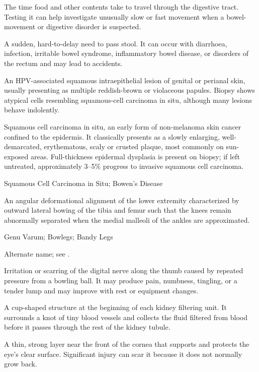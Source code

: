  The time food and other contents take to travel through the digestive tract. Testing it can help investigate unusually slow or fast movement when a bowel-movement or digestive disorder is suspected.

 A sudden, hard-to-delay need to pass stool. It can occur with diarrhoea, infection, irritable bowel syndrome, inflammatory bowel disease, or disorders of the rectum and may lead to accidents.

 An HPV-associated squamous intraepithelial lesion of genital or perianal skin, usually presenting as multiple reddish-brown or violaceous papules. Biopsy shows atypical cells resembling squamous-cell carcinoma in situ, although many lesions behave indolently.

 Squamous cell carcinoma in situ, an early form of non-melanoma skin cancer confined to the epidermis. It classically presents as a slowly enlarging, well-demarcated, erythematous, scaly or crusted plaque, most commonly on sun-exposed areas. Full-thickness epidermal dysplasia is present on biopsy; if left untreated, approximately 3--5\% progress to invasive squamous cell carcinoma.

\synonyms
Squamous Cell Carcinoma in Situ; Bowen’s Disease

 An angular deformational alignment of the lower extremity characterized by outward lateral bowing of the tibia and femur such that the knees remain abnormally separated when the medial malleoli of the ankles are approximated.

\synonyms
Genu Varum; Bowlegs; Bandy Legs

 Alternate name; see .

 Irritation or scarring of the digital nerve along the thumb caused by repeated pressure from a bowling ball. It may produce pain, numbness, tingling, or a tender lump and may improve with rest or equipment changes.

 A cup-shaped structure at the beginning of each kidney filtering unit. It surrounds a knot of tiny blood vessels and collects the fluid filtered from blood before it passes through the rest of the kidney tubule.

 A thin, strong layer near the front of the cornea that supports and protects the eye's clear surface. Significant injury can scar it because it does not normally grow back.

